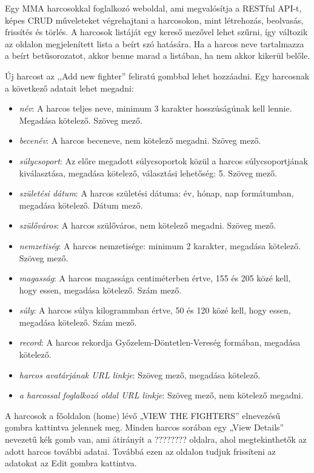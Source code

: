 
Egy MMA harcosokkal foglalkozó weboldal, ami megvalósítja a RESTful API-t, képes CRUD műveleteket végrehajtani a harcosokon, mint létrehozás, beolvasás, frissítés és törlés. A harcosok listáját egy kereső mezővel lehet szűrni, így változik az oldalon megjelenített lista a beírt szó hatására. Ha a harcos neve tartalmazza a beírt betűsorozatot, akkor benne marad a listában, ha nem akkor kikerül belőle.

Új harcost az ,,Add new fighter'' feliratú gombbal lehet hozzáadni. Egy harcosnak a következő adatait lehet megadni:

\begin{itemize}
\item \textit{név}: A harcos teljes neve, minimum 3 karakter hosszúságúnak kell lennie. Megadása kötelező. Szöveg mező.
\item \textit{becenév}: A harcos beceneve, nem kötelező megadni. Szöveg mező.
\item \textit{súlycsoport}: Az előre megadott súlycsoportok közül a harcos súlycsoportjának kiválasztása, megadása kötelező, választási lehetőség: 5. Szöveg mező.
\item \textit{születési dátum}: A harcos születési dátuma: év, hónap, nap formátumban, megadása kötelező. Dátum mező.
\item \textit{szülőváros}: A harcos szülőváros, nem kötelező megadni. Szöveg mező.
\item \textit{nemzetiség}: A harcos nemzetisége: minimum 2 karakter, megadása kötelező. Szöveg mező.
\item \textit{magasság}: A harcos magassága centiméterben értve, 155 és 205 közé kell, hogy essen, megadása kötelező. Szám mező.
\item \textit{súly}: A harcos súlya kilogrammban értve, 50 és 120 közé kell, hogy essen, megadása kötelező.  Szám mező.
\item \textit{record}: A harcos rekordja Győzelem-Döntetlen-Vereség formában, megadása kötelező. 
\item \textit{harcos avatárjának URL linkje}: Szöveg mező, megadása kötelező.
\item \textit{a harcossal foglalkozó oldal URL linkje}: Szöveg mező, nem kötelező megadni.
\end{itemize}

A harcosok a főoldalon (home) lévő „VIEW THE FIGHTERS” elnevezésű gombra kattintva jelennek meg. Minden harcos sorában egy „View Details” nevezetű kék gomb van, ami átirányít a ???????? oldalra, ahol megtekinthetők az adott harcos további adatai. Továbbá ezen az oldalon tudjuk frissíteni az adatokat az Edit gombra kattintva.

